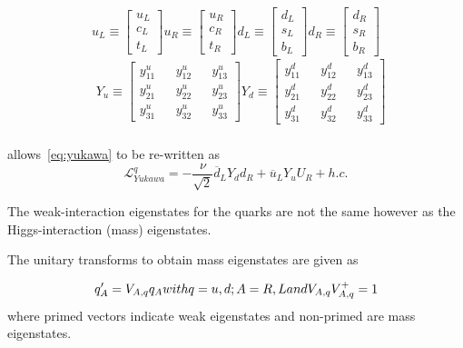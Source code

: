 \begin{equation}
  u_{L} \equiv \begin{bmatrix}u_{L}\\c_{L}\\t_{L}\end{bmatrix}
  u_{R} \equiv \begin{bmatrix}u_{R}\\c_{R}\\t_{R}\end{bmatrix}
  d_{L} \equiv \begin{bmatrix}d_{L}\\s_{L}\\b_{L}\end{bmatrix}
  d_{R} \equiv \begin{bmatrix}d_{R}\\s_{R}\\b_{R}\end{bmatrix}
  \label{eq:yukdef1}
\end{equation}
\begin{equation}
  \begin{split}
    &
    Y_{u} \equiv \begin{bmatrix}y^{u}_{11}&&y^{u}_{12}&&y^{u}_{13}\\y^{u}_{21}&&y^{u}_{22}&&y^{u}_{23}\\y^{u}_{31}&&y^{u}_{32}&&y^{u}_{33}\end{bmatrix}
    Y_{d} \equiv \begin{bmatrix}y^{d}_{11}&&y^{d}_{12}&&y^{d}_{13}\\y^{d}_{21}&&y^{d}_{22}&&y^{d}_{23}\\y^{d}_{31}&&y^{d}_{32}&&y^{d}_{33}\end{bmatrix}
    \\
  \end{split}
\end{equation}

allows~\autoref{eq:yukawa} to be re-written as
\begin{equation}
  \mathcal{L}^{q}_{Yukawa} = -\frac{\nu}{\sqrt{2}}{\overline{d}_{L}Y_{d}d_{R} + \overline{u}_{L}Y_{u}U_{R} + h.c.}
\end{equation}


The weak-interaction eigenstates for the quarks are not the same however as the Higgs-interaction (mass) eigenstates.

The unitary transforms to obtain mass eigenstates are given as

\begin{equation}
  q^{\prime}_{A} = V_{A,q}q_{A} $$with$$ q = u,d;   A = R,L $$and$$ V_{A,q}V^{+}_{A,q} = 1
  \label{eq:yukdef2}
\end{equation}
where primed vectors indicate weak eigenstates and non-primed are mass eigenstates.

